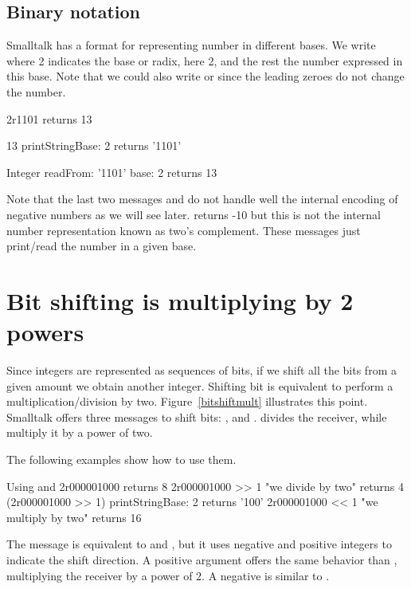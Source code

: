 \documentclass[a4paper,10pt,twoside]{book}
\begin{document}
\subsection*{Binary notation}
Smalltalk has a format for representing number in different bases. We write  where 2 indicates the base or radix, here 2, and the rest the number expressed in this base. Note that we could also write  or  since the leading zeroes do not change the number.
\begin{code}{}
2r1101
	returns 13

13 printStringBase: 2
	returns '1101'
	
Integer readFrom: '1101' base: 2 	
	returns 13
\end{code}

Note that the last two messages  and  do not handle well the internal encoding of negative numbers as we will see later.  returns -10 but this is not the internal number representation known as two's complement. These messages just print/read the number in a given base. 



\section{Bit shifting is multiplying by 2 powers}

Since integers are represented as sequences of bits, if we shift all the bits from a given amount we obtain another integer. Shifting bit is equivalent to perform a multiplication/division by two. Figure~\ref{bitshiftmult} illustrates this point. Smalltalk offers three messages to shift bits: ,  and . \ct{>>} divides the receiver, while \ct{<<} multiply it by a power of two.

The following examples show how to use them.


\begin{code}{Using \ct{>>} and \ct{<<}}
2r000001000 
	returns 8
2r000001000 >> 1					"we divide by two"
	returns 4
(2r000001000 >> 1) printStringBase: 2 	
	returns '100'
2r000001000 << 1					"we multiply by two"
	returns 16
\end{code}

The message  is equivalent to \ct{>>} and \ct{<<}, but it uses negative and positive integers to indicate the shift direction. A positive argument offers the same behavior than \ct{<<}, multiplying the receiver by a power of 2. A negative is similar to \ct{>>}. 
\end{document}
